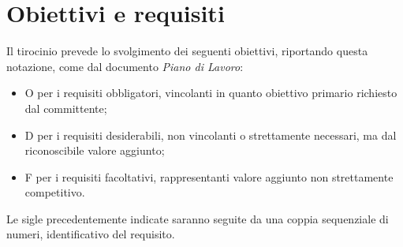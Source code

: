 \newpage

\section{Obiettivi e requisiti}\label{sec:obiettivi-requisiti}

Il tirocinio prevede lo svolgimento dei seguenti obiettivi, riportando questa notazione, come dal documento \textit{Piano di Lavoro}:
\begin{itemize}
    \item O per i requisiti obbligatori, vincolanti in quanto obiettivo primario richiesto dal committente;
    \item D per i requisiti desiderabili, non vincolanti o strettamente necessari, ma dal riconoscibile valore aggiunto;
    \item F per i requisiti facoltativi, rappresentanti valore aggiunto non strettamente competitivo.
\end{itemize}
Le sigle precedentemente indicate saranno seguite da una coppia sequenziale di numeri, identificativo del requisito.

